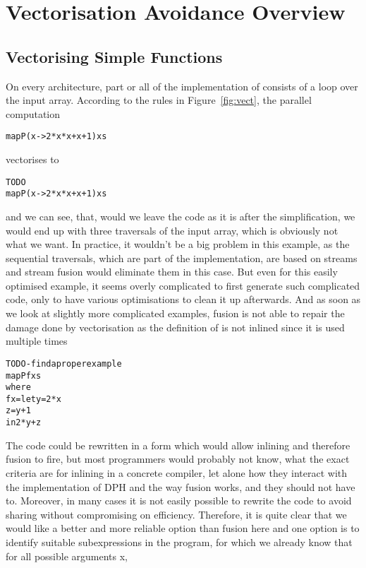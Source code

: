 \section{Vectorisation Avoidance Overview}

\subsection{Vectorising Simple Functions}
On every architecture, part or all of the implementation of \icode@mapP@ consists of
a loop over the input array. 
According to the rules in Figure~\ref{fig:vect}, the parallel computation
\begin{alltt}
  mapP (x  -> 2 * x * x + x + 1) xs
\end{alltt}
vectorises to 
\begin{alltt}
  TODO
  mapP (x  -> 2 * x * x + x + 1) xs
\end{alltt}
and we can see, that, would we leave the code as it is after the simplification, we would end up with
three traversals of the input array, which is obviously not what we want. In practice, it wouldn't be
a big problem in this example, as the sequential traversals, which are part of the implementation, are based on streams and stream fusion would eliminate them in this case. But even for this easily 
optimised example, it seems overly complicated to first generate such complicated code, only to have
various optimisations to clean it up afterwards. And as soon as we look at slightly more complicated
examples, fusion is not able to repair the damage done by vectorisation as the definition of \icode@y@ is not inlined since it is used multiple times
\begin{alltt}
  TODO - find a proper example
  mapP f xs
  where
     f x = let y = 2 * x
               z = y + 1
           in 2 * y + z
\end{alltt}
  The code could be rewritten in a form which would allow inlining and therefore fusion to fire, but
  most programmers would probably not know, what the exact criteria are for inlining in a concrete 
  compiler, let alone how they interact with the implementation of DPH and the way fusion works, and
  they should not have to. Moreover, in many cases it is not easily possible to rewrite the code to
  avoid sharing without compromising on efficiency. Therefore, it is quite clear that we would like a
  better and more reliable option than fusion here and one option is to identify suitable subexpressions in the program, for which we already know that  for all possible arguments x,

